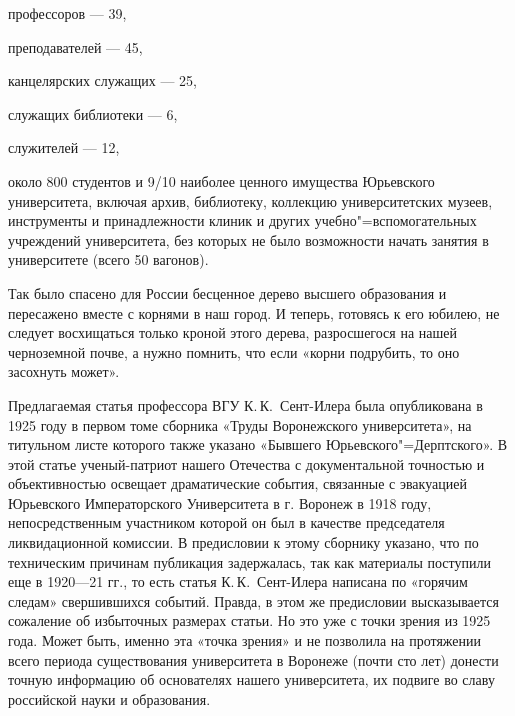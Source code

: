 профессоров — 39,

преподавателей — 45,

канцелярских служащих — 25,

служащих библиотеки — 6,

служителей — 12,

около 800 студентов и 9/10 наиболее ценного имущества Юрьевского университета,
включая архив, библиотеку, коллекцию университетских музеев, инструменты и при\-на\-д\-ле\-ж\-но\-с\-ти клиник и других учебно"=вспомогательных учреждений университета, без которых не было возможности начать занятия в университете (всего 50 вагонов).

Так было спасено для России бесценное дерево высшего образования и пересажено вместе с корнями в наш город. И теперь, готовясь к его юбилею, не следует восхищаться только кроной этого дерева, разросшегося на нашей черноземной почве, а нужно помнить, что если «корни подрубить, то оно засохнуть может».

Предлагаемая статья профессора ВГУ К.\,К.~Сент-Илера была опубликована в 1925 году
в первом томе сборника «Труды Воронежского университета»,
на титульном листе которого также указано «Бывшего Юрьевского"=Дер\-п\-т\-с\-ко\-го». В этой статье ученый-патриот нашего Отечества с документальной точностью и объективностью освещает драматические события, связанные с эвакуацией Юрьевского Императорского Университета в г. Воронеж в 1918 году, непосредственным участником которой он был в качестве председателя ликвидационной комиссии. В предисловии к этому сборнику указано, что по техническим причинам публикация задержалась, так как материалы поступили еще в 1920—21 гг., то есть статья
К.\,К.~Сент-Илера написана по «горячим следам» свершившихся событий.
Правда, в этом же предисловии высказывается сожаление об избыточных размерах статьи.
Но это уже с точки зрения из 1925 года.
Может быть, именно эта «точка зрения» и не позволила на протяжении всего периода существования университета в Воронеже
(почти сто лет) донести точную информацию об основателях нашего университета,
их подвиге во славу российской науки и образования.
